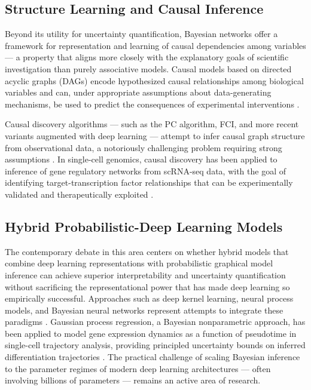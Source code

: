 \subsection{Structure Learning and Causal Inference}

Beyond its utility for uncertainty quantification, Bayesian networks offer a framework for representation and learning of causal dependencies among variables --- a property that aligns more closely with the explanatory goals of scientific investigation than purely associative models. Causal models based on directed acyclic graphs (DAGs) encode hypothesized causal relationships among biological variables and can, under appropriate assumptions about data-generating mechanisms, be used to predict the consequences of experimental interventions \parencite{pearl2009}.

Causal discovery algorithms --- such as the PC algorithm, FCI, and more recent variants augmented with deep learning --- attempt to infer causal graph structure from observational data, a notoriously challenging problem requiring strong assumptions \parencite{spirtes2000}. In single-cell genomics, causal discovery has been applied to inference of gene regulatory networks from scRNA-seq data, with the goal of identifying target-transcription factor relationships that can be experimentally validated and therapeutically exploited \parencite{skokgibbs2022}.

\subsection{Hybrid Probabilistic-Deep Learning Models}

The contemporary debate in this area centers on whether hybrid models that combine deep learning representations with probabilistic graphical model inference can achieve superior interpretability and uncertainty quantification without sacrificing the representational power that has made deep learning so empirically successful. Approaches such as deep kernel learning, neural process models, and Bayesian neural networks represent attempts to integrate these paradigms \parencite{wilson2020}. Gaussian process regression, a Bayesian nonparametric approach, has been applied to model gene expression dynamics as a function of pseudotime in single-cell trajectory analysis, providing principled uncertainty bounds on inferred differentiation trajectories \parencite{lonnberg2017}. The practical challenge of scaling Bayesian inference to the parameter regimes of modern deep learning architectures --- often involving billions of parameters --- remains an active area of research.


